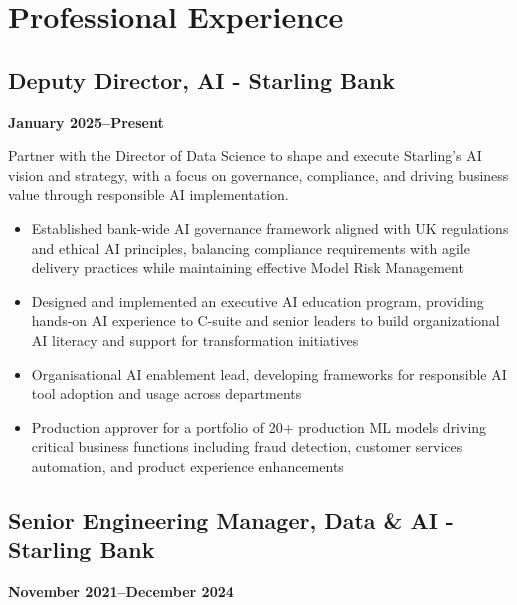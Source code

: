\documentclass[a4paper]{scrartcl}
\begin{document}
\section*{Professional Experience}

\subsection*{Deputy Director, AI - Starling Bank}
\textbf{January 2025--Present}

Partner with the Director of Data Science to shape and execute Starling's AI vision and strategy, with a focus on governance, compliance, and driving business value through responsible AI implementation.
\begin{itemize}
	\item Established bank-wide AI governance framework aligned with UK regulations and ethical AI principles, balancing compliance requirements with agile delivery practices while maintaining effective Model Risk Management
	\item Designed and implemented an executive AI education program, providing hands-on AI experience to C-suite and senior leaders to build organizational AI literacy and support for transformation initiatives
	\item Organisational AI enablement lead, developing frameworks for responsible AI tool adoption and usage across departments
	\item Production approver for a portfolio of 20+ production ML models driving critical business functions including fraud detection, customer services automation, and product experience enhancements
\end{itemize}

\subsection*{Senior Engineering Manager, Data \& AI - Starling Bank}
\textbf{November 2021--December 2024}
\end{document}
